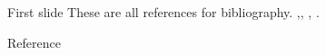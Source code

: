 \documentclass[xcolor={dvipsnames,table},12pt]{beamer}
\begin{document}
\begin{frame}{First slide}
These are all references for bibliography.
\cite{Balle2002} ,\cite{Holden2005}, \cite{Delery2000}, \cite{Bountin2013}.
\end{frame}

\begin{frame}[allowframebreaks]{Reference}
 

\end{frame}
\end{document}
